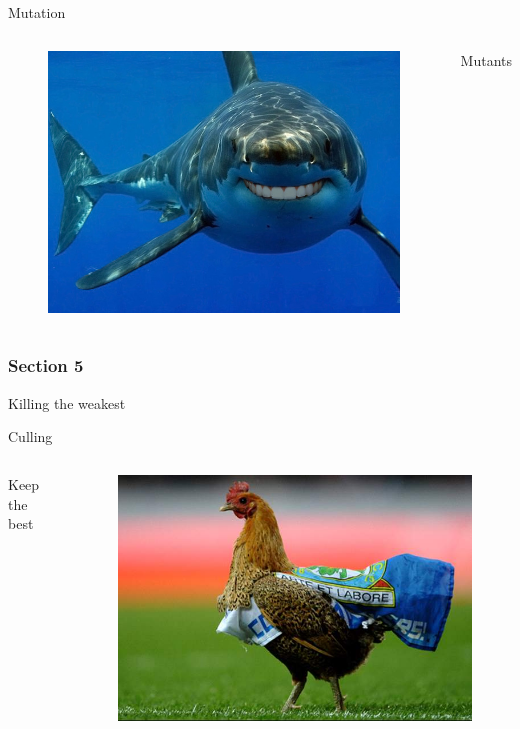 \documentclass[24pt]{beamer}
\begin{document}
    \begin{frame}{Mutation}
        \begin{columns}
                \begin{figure}
                \includegraphics[scale=0.3]{shark}
                \end{figure}
                Mutants
        \end{columns}
    \end{frame}

    \begin{centering}
        \begin{frame}[c]{}
            \frametitle{Section 5}
            Killing the weakest
        \end{frame}
    \end{centering}

    \begin{frame}{Culling}
        \begin{columns}
                Keep the best
                \begin{figure}
                \includegraphics[scale=1]{chicken}
                \end{figure}
        \end{columns}
    \end{frame}
\end{document}
